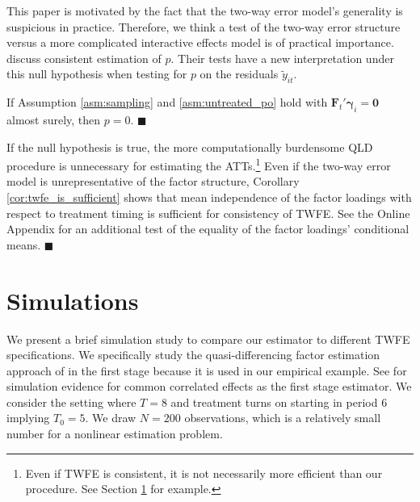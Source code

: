 \documentclass[12pt]{article}
\begin{document}
\begin{remark}\label{remark:twfe_testing}
  This paper is motivated by the fact that the two-way error model's generality is suspicious in practice. Therefore, we think a test of the two-way error structure versus a more complicated interactive effects model is of practical importance. \citet{Ahn_Lee_Schmidt_2013} discuss consistent estimation of $p$. Their tests have a new interpretation under this null hypothesis when testing for $p$ on the residuals $\tilde{y}_{it}$.

  \begin{theorem}
    If Assumption \ref{asm:sampling} and \ref{asm:untreated_po} hold with $\bm{F}_t' \bm \gamma_i = \bm 0$ almost surely, then $p = 0$. $\blacksquare$
  \end{theorem}
  If the null hypothesis is true, the more computationally burdensome QLD procedure is unnecessary for estimating the ATTs.\footnote{Even if TWFE is consistent, it is not necessarily more efficient than our procedure. See Section \ref{sec:simulations} for example.} Even if the two-way error model is unrepresentative of the factor structure, Corollary \ref{cor:twfe_is_sufficient} shows that mean independence of the factor loadings with respect to treatment timing is sufficient for consistency of TWFE. See the Online Appendix for an additional test of the equality of the factor loadings' conditional means. $\blacksquare$
\end{remark}


\section{Simulations}\label{sec:simulations}

We present a brief simulation study to compare our estimator to different TWFE specifications. We specifically study the quasi-differencing factor estimation approach of \citet{Ahn_Lee_Schmidt_2013} in the first stage because it is used in our empirical example. See \citet{Brown_Butts_Westerlund_2023} for simulation evidence for common correlated effects as the first stage estimator. We consider the setting where $T = 8$ and treatment turns on starting in period 6 implying $T_0 = 5$. We draw $N = 200$ observations, which is a relatively small number for a nonlinear estimation problem.
\end{document}
